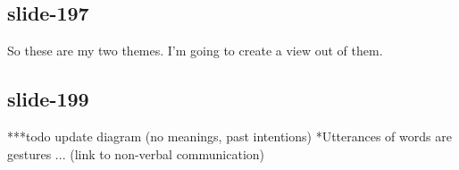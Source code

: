 \documentclass[12pt,\papersize]{extarticle}
\begin{document}
 
\subsection{slide-197}
So these are my two themes.
I'm going to create a view out of them.
 
 
\subsection{slide-199}
***todo update diagram (no meanings, past intentions)
*Utterances of words are gestures ... (link to non-verbal communication)

 






\end{document}
